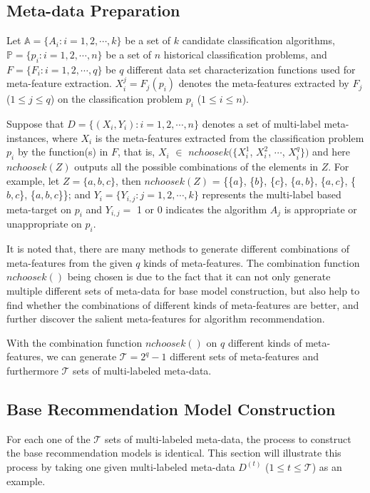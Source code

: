 \documentclass[prodmode,acmtkdd]{acmsmall}
\begin{document}
\subsection{Meta-data Preparation}\label{subsec:DataCollection}

Let $\mathbb{A} = \{A_i: i = 1, 2, \cdots, k\}$ be a set of $k$
candidate classification algorithms, $\mathbb{P} = \{p_i: i = 1, 2,
\cdots, n\}$ be a set of $n$ historical classification problems, and
$F = \{F_i: i = 1, 2, \cdots, q\}$ be $q$ different data set
characterization functions used for meta-feature extraction.
$X_{i}^{j} = F_{j}(p_i)$ denotes the meta-features extracted by
$F_j$ ($1\leq j \leq q$) on the classification problem $p_i$ ($1\leq
i\leq n$).

Suppose that $D = \{(X_i, Y_i): i = 1, 2, \cdots, n\}$ denotes a set
of multi-label meta-instances, where $X_i$ is the meta-features
extracted from the classification problem $p_i$ by the function(s)
in $F$, that is, $X_i$ $\in$ $nchoosek(\{X_{i}^{1}$, $X_{i}^{2}$,
$\cdots$, $X_{i}^{q}\})$ and here $nchoosek(Z)$ outputs all the
possible combinations of the elements in $Z$. For example, let $Z =
\{a,b,c\}$, then $nchoosek(Z)$ = \{\{$a$\}, \{$b$\}, \{$c$\},
\{$a,b$\}, \{$a,c$\}, \{$b,c$\}, \{$a,b,c$\}\}; and $Y_i =
\{Y_{i,j}: j = 1, 2, \cdots, k\}$ represents the multi-label based
meta-target on $p_i$ and $Y_{i,j} =$ 1 or 0 indicates the algorithm
$A_j$ is appropriate or unappropriate on $p_i$.

It is noted that, there are many methods to generate different
combinations of meta-features from the given $q$ kinds of
meta-features. The combination function $nchoosek()$ being chosen is
due to the fact that it can not only generate multiple different
sets of meta-data for base model construction, but also help to find
whether the combinations of different kinds of meta-features are
better, and further discover the salient meta-features for algorithm
recommendation.

With the combination function $nchoosek()$ on $q$ different kinds of
meta-features, we can generate $\mathcal{T} = 2^q - 1$ different sets of
meta-features and furthermore $\mathcal{T}$ sets of multi-labeled meta-data.

\subsection{Base Recommendation Model Construction}\label{subsec:baseModel}

For each one of the $\mathcal{T}$ sets of multi-labeled meta-data, the process
to construct the base recommendation models is identical. This
section will illustrate this process by taking one given
multi-labeled meta-data $D^{(t)}$ ($1 \leq t \leq \mathcal{T}$) as an example.
\end{document}
